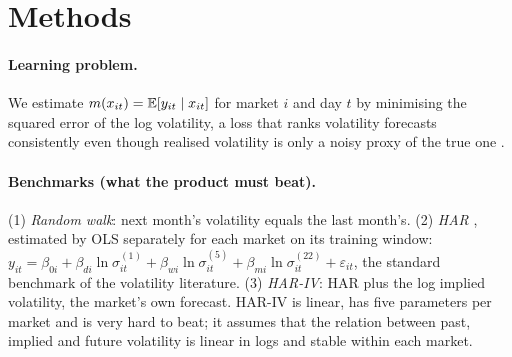 \section{Methods}\label{sec:methods}

\paragraph{Learning problem.} We estimate $m(x_{it})=\mathbb{E}[y_{it}\mid x_{it}]$ for market $i$ and day $t$
by minimising the squared error of the log volatility, a loss that ranks volatility forecasts consistently
even though realised volatility is only a noisy proxy of the true one \citep{patton2011}.

\paragraph{Benchmarks (what the product must beat).} (1) \emph{Random walk}: next month's volatility equals
the last month's. (2) \emph{HAR} \citep{corsi2009}, estimated by OLS separately for each market on its
training window: $y_{it}=\beta_{0i}+\beta_{di}\ln\sigma^{(1)}_{it}+\beta_{wi}\ln\sigma^{(5)}_{it}
+\beta_{mi}\ln\sigma^{(22)}_{it}+\varepsilon_{it}$, the standard benchmark of the volatility literature.
(3) \emph{HAR-IV}: HAR plus the log implied volatility, the market's own forecast. HAR-IV is linear, has five
parameters per market and is very hard to beat; it assumes that the relation between past, implied and
future volatility is linear in logs and stable within each market.

